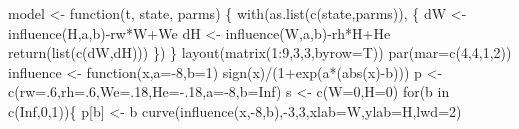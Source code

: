 \documentclass[
  a4paper,
  DIV=11,
  numbers=noendperiod,
  oneside]{scrreprt}
\newenvironment{Shaded}{\begin{snugshade}}{\end{snugshade}}
\newcommand{\AttributeTok}[1]{\textcolor[rgb]{0.40,0.45,0.13}{#1}}
\newcommand{\ConstantTok}[1]{\textcolor[rgb]{0.56,0.35,0.01}{#1}}
\newcommand{\ControlFlowTok}[1]{\textcolor[rgb]{0.00,0.23,0.31}{#1}}
\newcommand{\DecValTok}[1]{\textcolor[rgb]{0.68,0.00,0.00}{#1}}
\newcommand{\FunctionTok}[1]{\textcolor[rgb]{0.28,0.35,0.67}{#1}}
\newcommand{\NormalTok}[1]{\textcolor[rgb]{0.00,0.23,0.31}{#1}}
\newcommand{\OtherTok}[1]{\textcolor[rgb]{0.00,0.23,0.31}{#1}}
\newcommand{\SpecialCharTok}[1]{\textcolor[rgb]{0.37,0.37,0.37}{#1}}
\newcommand{\StringTok}[1]{\textcolor[rgb]{0.13,0.47,0.30}{#1}}
\begin{document}
\begin{Shaded}
\begin{Highlighting}[]
\NormalTok{model }\OtherTok{\textless{}{-}} \ControlFlowTok{function}\NormalTok{(t, state, parms) \{}
  \FunctionTok{with}\NormalTok{(}\FunctionTok{as.list}\NormalTok{(}\FunctionTok{c}\NormalTok{(state,parms)), \{}
\NormalTok{    dW }\OtherTok{\textless{}{-}} \FunctionTok{influence}\NormalTok{(H,a,b)}\SpecialCharTok{{-}}\NormalTok{rw}\SpecialCharTok{*}\NormalTok{W}\SpecialCharTok{+}\NormalTok{We}
\NormalTok{    dH }\OtherTok{\textless{}{-}} \FunctionTok{influence}\NormalTok{(W,a,b)}\SpecialCharTok{{-}}\NormalTok{rh}\SpecialCharTok{*}\NormalTok{H}\SpecialCharTok{+}\NormalTok{He}
    \FunctionTok{return}\NormalTok{(}\FunctionTok{list}\NormalTok{(}\FunctionTok{c}\NormalTok{(dW,dH)))}
\NormalTok{  \})}
\NormalTok{\}}
\FunctionTok{layout}\NormalTok{(}\FunctionTok{matrix}\NormalTok{(}\DecValTok{1}\SpecialCharTok{:}\DecValTok{9}\NormalTok{,}\DecValTok{3}\NormalTok{,}\DecValTok{3}\NormalTok{,}\AttributeTok{byrow=}\NormalTok{T))}
\FunctionTok{par}\NormalTok{(}\AttributeTok{mar=}\FunctionTok{c}\NormalTok{(}\DecValTok{4}\NormalTok{,}\DecValTok{4}\NormalTok{,}\DecValTok{1}\NormalTok{,}\DecValTok{2}\NormalTok{))}
\NormalTok{influence }\OtherTok{\textless{}{-}} \ControlFlowTok{function}\NormalTok{(x,}\AttributeTok{a=}\SpecialCharTok{{-}}\DecValTok{8}\NormalTok{,}\AttributeTok{b=}\DecValTok{1}\NormalTok{) }\FunctionTok{sign}\NormalTok{(x)}\SpecialCharTok{/}\NormalTok{(}\DecValTok{1}\SpecialCharTok{+}\FunctionTok{exp}\NormalTok{(a}\SpecialCharTok{*}\NormalTok{(}\FunctionTok{abs}\NormalTok{(x)}\SpecialCharTok{{-}}\NormalTok{b)))}
\NormalTok{p }\OtherTok{\textless{}{-}} \FunctionTok{c}\NormalTok{(}\AttributeTok{rw=}\NormalTok{.}\DecValTok{6}\NormalTok{,}\AttributeTok{rh=}\NormalTok{.}\DecValTok{6}\NormalTok{,}\AttributeTok{We=}\NormalTok{.}\DecValTok{18}\NormalTok{,}\AttributeTok{He=}\SpecialCharTok{{-}}\NormalTok{.}\DecValTok{18}\NormalTok{,}\AttributeTok{a=}\SpecialCharTok{{-}}\DecValTok{8}\NormalTok{,}\AttributeTok{b=}\ConstantTok{Inf}\NormalTok{)}
\NormalTok{s }\OtherTok{\textless{}{-}} \FunctionTok{c}\NormalTok{(}\AttributeTok{W=}\DecValTok{0}\NormalTok{,}\AttributeTok{H=}\DecValTok{0}\NormalTok{)}
\ControlFlowTok{for}\NormalTok{(b }\ControlFlowTok{in} \FunctionTok{c}\NormalTok{(}\ConstantTok{Inf}\NormalTok{,}\DecValTok{0}\NormalTok{,}\DecValTok{1}\NormalTok{))\{}
\NormalTok{p[}\StringTok{\textquotesingle{}b\textquotesingle{}}\NormalTok{] }\OtherTok{\textless{}{-}}\NormalTok{ b}
\FunctionTok{curve}\NormalTok{(}\FunctionTok{influence}\NormalTok{(x,}\SpecialCharTok{{-}}\DecValTok{8}\NormalTok{,b),}\SpecialCharTok{{-}}\DecValTok{3}\NormalTok{,}\DecValTok{3}\NormalTok{,}\AttributeTok{xlab=}\StringTok{\textquotesingle{}W\textquotesingle{}}\NormalTok{,}\AttributeTok{ylab=}\StringTok{\textquotesingle{}H\textquotesingle{}}\NormalTok{,}\AttributeTok{lwd=}\DecValTok{2}\NormalTok{)}

\end{Highlighting}
\end{Shaded}
\end{document}
